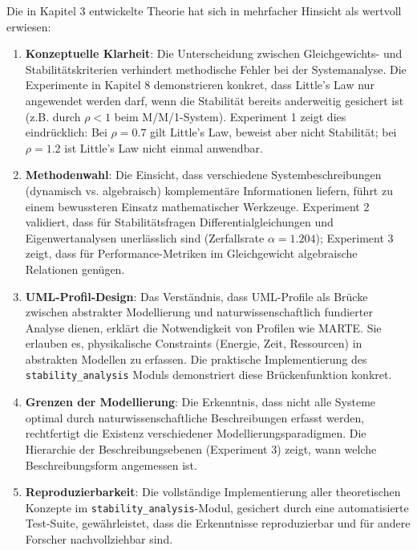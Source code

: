 ﻿\documentclass[a4paper,12pt]{report}
\theoremstyle{definition}
\begin{document}
Die in Kapitel 3 entwickelte Theorie hat sich in mehrfacher Hinsicht als wertvoll erwiesen:

\begin{enumerate}
	\item[-] \textbf{Konzeptuelle Klarheit}: Die Unterscheidung zwischen Gleichgewichts- und Stabilitätskriterien verhindert methodische Fehler bei der Systemanalyse. Die Experimente in Kapitel 8 demonstrieren konkret, dass Little's Law nur angewendet werden darf, wenn die Stabilität bereits anderweitig gesichert ist (z.B. durch $\rho < 1$ beim M/M/1-System). Experiment 1 zeigt dies eindrücklich: Bei $\rho = 0.7$ gilt Little's Law, beweist aber nicht Stabilität; bei $\rho = 1.2$ ist Little's Law nicht einmal anwendbar.
	
	\item[-] \textbf{Methodenwahl}: Die Einsicht, dass verschiedene Systembeschreibungen (dynamisch vs. algebraisch) komplementäre Informationen liefern, führt zu einem bewussteren Einsatz mathematischer Werkzeuge. Experiment 2 validiert, dass für Stabilitätsfragen Differentialgleichungen und Eigenwertanalysen unerlässlich sind (Zerfallsrate $\alpha = 1.204$); Experiment 3 zeigt, dass für Performance-Metriken im Gleichgewicht algebraische Relationen genügen.
	
	\item[-] \textbf{UML-Profil-Design}: Das Verständnis, dass UML-Profile als Brücke zwischen abstrakter Modellierung und naturwissenschaftlich fundierter Analyse dienen, erklärt die Notwendigkeit von Profilen wie MARTE. Sie erlauben es, physikalische Constraints (Energie, Zeit, Ressourcen) in abstrakten Modellen zu erfassen. Die praktische Implementierung des \texttt{stability\_analysis} Moduls demonstriert diese Brückenfunktion konkret.
	
	\item[-] \textbf{Grenzen der Modellierung}: Die Erkenntnis, dass nicht alle Systeme optimal durch naturwissenschaftliche Beschreibungen erfasst werden, rechtfertigt die Existenz verschiedener Modellierungsparadigmen. Die Hierarchie der Beschreibungsebenen (Experiment 3) zeigt, wann welche Beschreibungsform angemessen ist.
	
    \item[-] \textbf{Reproduzierbarkeit}: Die vollständige Implementierung
	aller theoretischen Konzepte im \texttt{stability\_analysis}-Modul,
	gesichert durch eine automatisierte Test-Suite, gewährleistet, dass
	die Erkenntnisse reproduzierbar und für andere Forscher nachvollziehbar
	sind.
\end{enumerate}
\end{document}
